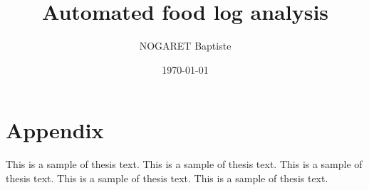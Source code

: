 \documentclass[12pt]{book}
\title{Automated food log analysis}
\author{NOGARET Baptiste}
\date{\today}
\begin{document}
\frontmatter

\maketitle





\sstableofcontents

\sslistoffigures

\sslistoftables





%
%
\mainmatter
















%
%
\appendix

\chapter{Appendix}

This is a sample of thesis text. This is a sample of thesis text. This is a 
sample of thesis text. This is a sample of thesis text. This is a sample of
thesis text.


\printbibliography
\end{document}
